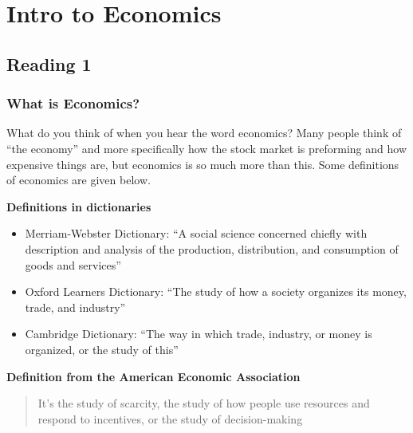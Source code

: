 \documentclass[
]{book}
\providecommand{\tightlist}{%
  \setlength{\itemsep}{0pt}\setlength{\parskip}{0pt}}
\begin{document}
\chapter{Intro to Economics}\label{intro-to-economics}

\section{Reading 1}\label{reading-1}

\subsection{What is Economics?}\label{what-is-economics}

What do you think of when you hear the word economics? Many people think of ``the economy'' and more specifically how the stock market is preforming and how expensive things are, but economics is so much more than this. Some definitions of economics are given below.

\textbf{Definitions in dictionaries}

\begin{itemize}
\tightlist
\item
  Merriam-Webster Dictionary: ``A social science concerned chiefly with description and analysis of the production, distribution, and consumption of goods and services''
\item
  Oxford Learners Dictionary: ``The study of how a society organizes its money, trade, and industry''
\item
  Cambridge Dictionary: ``The way in which trade, industry, or money is organized, or the study of this''
\end{itemize}

\textbf{Definition from the American Economic Association}

\begin{quote}
It's the study of scarcity, the study of how people use resources and respond to incentives, or the study of decision-making
\end{quote}
\end{document}
